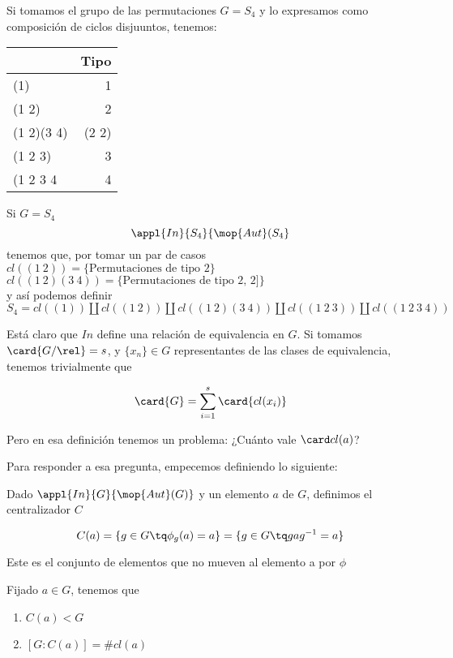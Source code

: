 \documentclass[nochap]{apuntes}
\begin{document}
\begin{example}
Si tomamos el grupo de las permutaciones $G=S_4$ y lo expresamos como composición de ciclos disjuuntos, tenemos:\\
\begin{center}
\begin{tabular}{|l|r|}
\hline
& Tipo\\
\hline
(1) & 1\\
(1 2) & 2\\
(1 2)(3 4) & (2 2)\\
(1 2 3) & 3\\
(1 2 3 4 & 4\\
\hline
\end{tabular}
\end{center}
Si $G=S_4$\\
$$\appl{In}{S_4}{\mop{Aut}(S_4}$$
tenemos que, por tomar un par de casos
$cl((1\ 2)) = \{ \text{Permutaciones de tipo 2} \}$\\
$cl((1\ 2)(3\ 4)) = \{ \text{Permutaciones de tipo 2, 2]} \}$\\
y así podemos definir\\
$S_4 = cl((1)) \coprod cl((1\ 2)) \coprod cl((1\ 2)(3\ 4)) \coprod cl((1\ 2\ 3)) \coprod cl((1\ 2\ 3\ 4))$
\end{example}

Está claro que $In$ define una relación de equivalencia en $G$. Si tomamos $\card{G/\rel} = s$, y $\{x_n\}∈G$ representantes de las clases de equivalencia, tenemos trivialmente que

\[ \card{G} = \sum_{i=1}^{s} \card{cl(x_i)} \]

Pero en esa definición tenemos un problema: ¿Cuánto vale $\card cl(a)$?

Para responder a esa pregunta, empecemos definiendo lo siguiente:

\begin{defn}[Centralizador] Dado $\appl{In}{G}{\mop{Aut}(G)}$ y un elemento $a$ de $G$, definimos el centralizador $C$

\[ C(a) = \{ g\in G \tq \phi _g(a) = a\} = \{ g\in G \tq gag^{-1} = a\} \]

Este es el conjunto de elementos que no mueven al elemento a por $\phi$
\end{defn}

\begin{theorem}\label{thmConj1}
Fijado $a\in G$, tenemos que
\begin{enumerate}
\item $C(a) < G$
\item $[ G:C(a) ] = \# cl(a) $
\end{enumerate}
\end{theorem}
\end{document}

